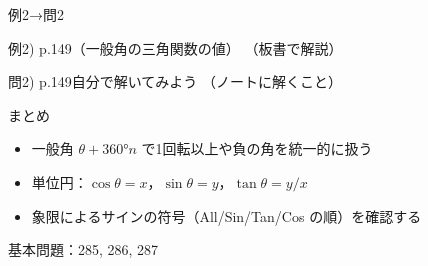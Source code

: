 \documentclass[aspectratio=43,professionalfonts,handout]{beamer}
\begin{document}
\begin{frame}{例2→問2}
  \begin{exampleblock}{例2) p.149（一般角の三角関数の値）}
    （板書で解説）
  \end{exampleblock}

  \vfill

  \begin{block}{問2) p.149\quad 自分で解いてみよう}
    （ノートに解くこと）
  \end{block}
\end{frame}

\begin{frame}{まとめ}
  \begin{itemize}
    \item 一般角 $\theta + 360° n$ で1回転以上や負の角を統一的に扱う
    \item 単位円：$\cos\theta = x$，$\sin\theta = y$，$\tan\theta = y/x$
    \item 象限によるサインの符号（All/Sin/Tan/Cos の順）を確認する
  \end{itemize}

  \vfill
  {\small 基本問題：285, 286, 287}
\end{frame}
\end{document}
